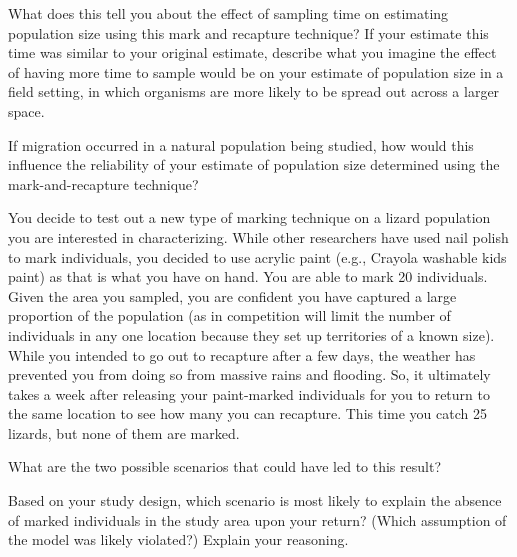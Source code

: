 \documentclass[12pt, hidelinks]{exam}
\newlength{\basespace}
\begin{document}
\begin{questions}
\vspace*{4\baselineskip}

\question[Checkout]
What does this tell you about the effect of sampling time on estimating
population size using this mark and recapture technique? If your estimate this time was
similar to your original estimate, describe what you imagine the effect
of having more time to sample would be on your estimate of population
size in a field setting, in which organisms are more likely to be spread
out across a larger space.

\vspace*{\basespace}


\question[Checkout]
If migration occurred in a natural population being studied, how
would this influence the reliability of your estimate of population size
determined using the mark-and-recapture technique?

\vspace*{\basespace}

\question[Checkout]
You decide to test out a new type of marking technique on a lizard
population you are interested in characterizing. While other researchers
have used nail polish to mark individuals, you decided to use acrylic
paint (e.g., Crayola washable kids paint) as that is what you have on
hand. You are able to mark 20 individuals. Given the area you sampled,
you are confident you have captured a large proportion of the population
(as in competition will limit the number of individuals in any one location
because they set up territories of a known size). While you intended to
go out to recapture after a few days, the weather has prevented you from
doing so from massive rains and flooding. So, it ultimately takes a week
after releasing your paint-marked individuals for you to return to the
same location to see how many you can recapture. This time you catch 25
lizards, but none of them are marked.

\medskip

What are the two possible scenarios that could have led to this result?

\vspace*{\basespace}

\question
Based on your study design, which scenario is most likely to explain the
absence of marked individuals in the study area upon your return? (Which
assumption of the model was likely violated?) Explain your reasoning.

\end{questions}
\end{document}
